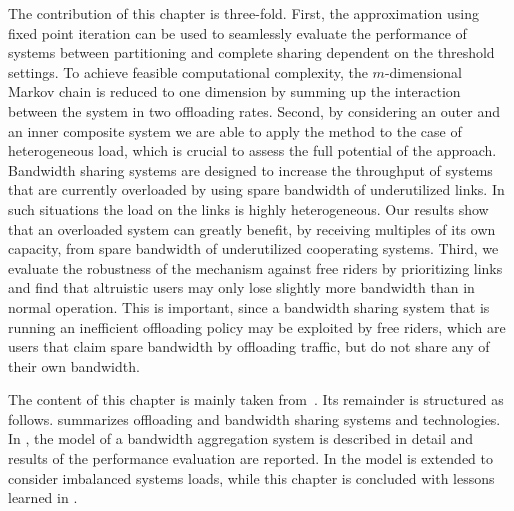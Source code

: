 
The contribution of this chapter is three-fold.
First, the approximation using fixed point iteration can be used to seamlessly evaluate the performance of systems between partitioning and complete sharing dependent on the threshold settings.
To achieve feasible computational complexity, the $m$-dimensional Markov chain is reduced to one dimension by summing up the interaction between the system in two offloading rates.
Second, by considering an outer and an inner composite system we are able to apply the method to the case of heterogeneous load, which is crucial to assess the full potential of the approach.
Bandwidth sharing systems are designed to increase the throughput of systems that are currently overloaded by using spare bandwidth of underutilized links.
In such situations the load on the links is highly heterogeneous.
Our results show that an overloaded system can greatly benefit, by receiving multiples of its own capacity, from spare bandwidth of underutilized cooperating systems.
Third, we evaluate the robustness of the mechanism against free riders by prioritizing links and find that altruistic users may only lose slightly more bandwidth than in normal operation.
This is important, since a bandwidth sharing system that is running an inefficient offloading policy may be exploited by free riders, which are users that claim spare bandwidth by offloading traffic, but do not share any of their own bandwidth.

The content of this chapter is mainly taken from~\cite{burger2016phycom,burger2017im}.
Its remainder is structured as follows.
 summarizes offloading and bandwidth sharing systems and technologies.
In , the model of a bandwidth aggregation system is described in detail and results of the performance evaluation are reported. In  the model is extended to consider imbalanced systems loads, while this chapter is concluded with lessons learned in .


% 




